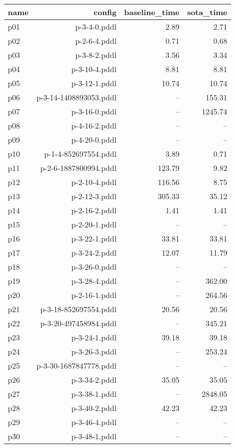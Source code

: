 \documentclass{article}
\begin{document}
                            \begin{center}
                            \scriptsize
                            \begin{tabular}{@{}l|r|r|r@{}}
                            name & config & baseline\_time & sota\_time\\\midrule
                              p01& p-3-4-0.pddl&2.89&2.71\\
  p02& p-2-6-4.pddl&0.71&0.68\\
  p03& p-3-8-2.pddl&3.56&3.34\\
  p04& p-3-10-4.pddl&8.81&8.81\\
  p05& p-3-12-1.pddl&10.74&10.74\\
  p06& p-3-14-1408893053.pddl&--&155.31\\
  p07& p-3-16-0.pddl&--&1245.74\\
  p08& p-4-16-2.pddl&--&--\\
  p09& p-4-20-0.pddl&--&--\\
  p10& p-1-4-852697554.pddl&3.89&0.71\\
  p11& p-2-6-1887800994.pddl&123.79&9.82\\
  p12& p-2-10-4.pddl&116.56&8.75\\
  p13& p-2-12-3.pddl&305.33&35.12\\
  p14& p-2-16-2.pddl&1.41&1.41\\
  p15& p-2-20-1.pddl&--&--\\
  p16& p-3-22-1.pddl&33.81&33.81\\
  p17& p-3-24-2.pddl&12.07&11.79\\
  p18& p-3-26-0.pddl&--&--\\
  p19& p-3-28-4.pddl&--&362.00\\
  p20& p-2-16-1.pddl&--&264.56\\
  p21& p-3-18-852697554.pddl&20.56&20.56\\
  p22& p-3-20-497458984.pddl&--&345.21\\
  p23& p-3-24-1.pddl&39.18&39.18\\
  p24& p-3-26-3.pddl&--&253.24\\
  p25& p-3-30-1687847778.pddl&--&--\\
  p26& p-3-34-2.pddl&35.05&35.05\\
  p27& p-3-38-1.pddl&--&2848.05\\
  p28& p-3-40-2.pddl&42.23&42.23\\
  p29& p-3-46-4.pddl&--&--\\
  p30& p-3-48-1.pddl&--&--
                            \end{tabular}
                            \end{center}
                    
\end{document}
